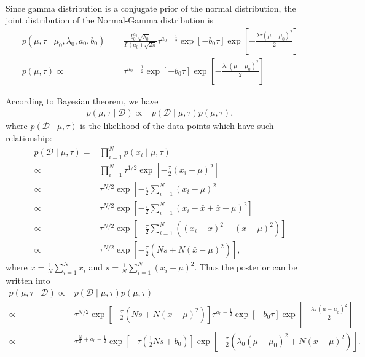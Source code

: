 \documentclass[11pt]{extarticle}
\newcommand{\D}{\mathcal{D}}
\newcommand{\0}{\mathbf{0}}
\renewcommand{\(}{\left(}
\renewcommand{\)}{\right)}
\theoremstyle{definition}
\begin{document}
\noindent{} \\
\par Since gamma distribution is a conjugate prior of the normal distribution, the joint distribution of the Normal-Gamma distribution is
\begin{align*}
    p(\mu, \tau \mid \mu_{0}, \lambda_{0}, a_{0}, b_{0}) =& \frac{b_{0}^{a_{0}} \sqrt{\lambda_{0}}}{\Gamma(a_{0})\sqrt{2\pi}} \tau^{a_{0}-\frac{1}{2}} \exp\left[-b_{0}\tau\right] \exp\left[-\frac{ \lambda \tau(\mu - \mu_{0})^2}{2}\right] \\
    p(\mu, \tau) \propto& \tau^{a_{0}-\frac{1}{2}} \exp\left[-b_{0}\tau\right] \exp\left[-\frac{ \lambda \tau(\mu - \mu_{0})^2}{2}\right]
\end{align*}
\par According to Bayesian theorem, we have
\begin{align*}
	p(\mu, \tau \mid \D) \propto& p(\D \mid \mu, \tau) p(\mu, \tau),
\end{align*}
where $p(\D \mid \mu, \tau)$ is the likelihood of the data points which have such relationship:
\begin{align*}
	p(\D \mid \mu, \tau) =& \prod_{i=1}^{N} p(x_{i} \mid \mu, \tau) \\
	\propto& \prod_{i=1}^{N} \tau^{1/2} \exp\left[-\frac{\tau}{2}(x_{i} - \mu)^{2}\right] \\
	\propto& \tau^{N/2} \exp\left[-\frac{\tau}{2}\sum_{i=1}^{N}(x_{i} - \mu)^{2}\right] \\
	\propto& \tau^{N/2} \exp\left[-\frac{\tau}{2}\sum_{i=1}^{N}(x_{i} - \bar{x} + \bar{x} - \mu)^{2}\right] \\
	\propto& \tau^{N/2} \exp\left[-\frac{\tau}{2}\sum_{i=1}^{N}\((x_{i}-\bar{x})^{2}+(\bar{x}-\mu)^{2}\)\right] \\
	\propto& \tau^{N/2} \exp\left[-\frac{\tau}{2}\(Ns+N(\bar{x}-\mu)^{2}\)\right],
\end{align*}
where $\bar{x} = \frac{1}{N}\sum_{i=1}^{N}x_{i}$ and $s = \frac{1}{N}\sum_{i=1}^{N}(x_{i}-\mu)^{2}$. Thus the posterior can be written into \cite{Doing}
\begin{align*}
	p(\mu, \tau \mid \D) \propto& p(\D \mid \mu, \tau) p(\mu, \tau) \\
	\propto& \tau^{N/2} \exp\left[-\frac{\tau}{2}\(Ns+N(\bar{x}-\mu)^{2}\)\right] \tau^{a_{0}-\frac{1}{2}} \exp\left[-b_{0}\tau\right] \exp\left[-\frac{ \lambda \tau(\mu - \mu_{0})^2}{2}\right] \\
	\propto& \tau^{\frac{N}{2} + a_{0} - \frac{1}{2}} \exp\left[-\tau\left(\frac{1}{2}Ns + b_{0}\right)\right]\exp\left[-\frac{\tau}{2}\left(\lambda_{0}(\mu - \mu_{0})^{2} + N(\bar{x} - \mu)^{2}\right)\right].
\end{align*}
\end{document}

